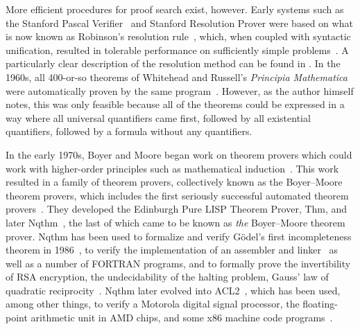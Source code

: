 More efficient procedures for proof search exist, however.
Early systems such as the Stanford Pascal Verifier~\cite{luckham1979stanford} and Stanford Resolution Prover were based on what is now known as Robinson's resolution rule~\cite{Machine1965Robinson}, which, when coupled with syntactic unification, resulted in tolerable performance on sufficiently simple problems~\cite{davis2001early,Brief2019Darbari}.
A particularly clear description of the resolution method can be found in \textcite[pp.~17--18]{Metamathematics1994Shankar}.
In the 1960s, all 400-or-so theorems of Whitehead and Russell's \emph{Principia Mathematica} were automatically proven by the same program~\cite[p.~9]{davis2001early}.
However, as the author himself notes, this was only feasible because all of the theorems could be expressed in a way where all universal quantifiers came first, followed by all existential quantifiers, followed by a formula without any quantifiers.

In the early 1970s, Boyer and Moore began work on theorem provers which could work with higher-order principles such as mathematical induction~\cite[p.~6]{Automation2013Moore}.
This work resulted in a family of theorem provers, collectively known as the Boyer--Moore theorem provers, which includes the first seriously successful automated theorem provers~\cites[p.~8]{Automation2013Moore}{Brief2019Darbari}.
They developed the Edinburgh Pure LISP Theorem Prover, Thm, and later Nqthm~\cites[p.~8]{Automation2013Moore}{Nqthm,wiki:Nqthm}, the last of which came to be known as \emph{the} Boyer--Moore theorem prover.
Nqthm has been used to formalize and verify Gödel's first incompleteness theorem in 1986~\cites{Metamathematics1994Shankar}[p.~29]{Milestones2019Moore}, to verify the implementation of an assembler and linker~\cite{moore2007piton} as well as a number of FORTRAN programs, and to formally prove the invertibility of RSA encryption, the undecidability of the halting problem, Gauss' law of quadratic reciprocity~\cite[pp.~28--29]{Milestones2019Moore}.
Nqthm later evolved into ACL2~\cite{Milestones2019Moore,ACL2Applications,ACL2}, which has been used, among other things, to verify a Motorola digital signal processor, the floating-point arithmetic unit in AMD chips, and some x86 machine code programs~\cite[p.~2]{Milestones2019Moore}.

